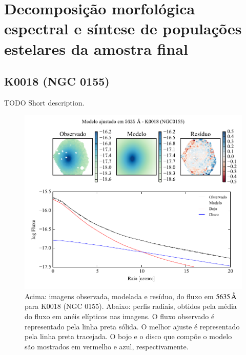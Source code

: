 


\chapter{Decomposição morfológica espectral e síntese de populações estelares
da amostra final}
\label{apendice:Decomp}



\section{K0018 (NGC 0155)}
\label{apendice:Decomp:K0018}

TODO Short description.

\begin{figure}
	\includegraphics[page=1]{figuras-decomp/K0018_sample006a}
	\caption[Ajuste morfológico em $5635\,\angstrom$ de K0018 (NGC 0155)]
	{Acima: imagens observada, modelada e resíduo, do fluxo em $5635\,\angstrom$
	para K0018 (NGC 0155). Abaixo: perfis radiais, obtidos pela média do fluxo em
	anéis elípticos nas imagens. O fluxo observado é representado pela linha preta
	sólida. O melhor ajuste é representado pela linha preta tracejada. O bojo e o
	disco que compõe o modelo são mostrados em vermelho e azul, respectivamente.}
	\label{fig:decompRadprof:K0018}
\end{figure}

